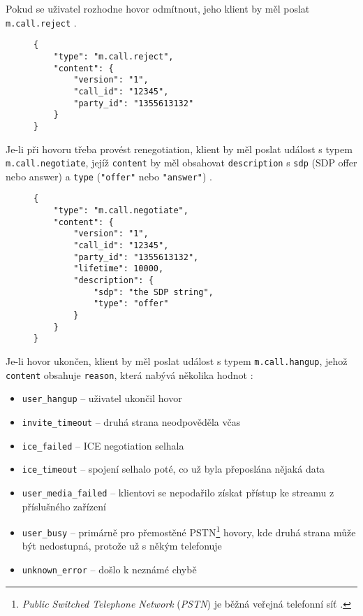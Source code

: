 Pokud se uživatel rozhodne hovor odmítnout, jeho klient by měl poslat
\texttt{m.call.reject} \parencite{GitHub-MSC2746}.

\begin{figure}[H]
    \begin{verbatim}
{
	"type": "m.call.reject",
	"content": {
		"version": "1",
		"call_id": "12345",
		"party_id": "1355613132"
	}
}
	\end{verbatim}
\end{figure}

Je-li při hovoru třeba provést renegotiation, klient by měl poslat událost s
typem \texttt{m.call.negotiate}, jejíž \texttt{content} by
měl obsahovat \texttt{description} s \texttt{sdp} (SDP offer
nebo answer) a \texttt{type} (\texttt{"offer"} nebo
\texttt{"answer"}) \parencite{GitHub-MSC2746}.

\begin{figure}[H]
    \begin{verbatim}
{
	"type": "m.call.negotiate",
	"content": {
		"version": "1",
		"call_id": "12345",
		"party_id": "1355613132",
		"lifetime": 10000,
		"description": {
			"sdp": "the SDP string",
			"type": "offer"
		}
	}
}
	\end{verbatim}
\end{figure}

Je-li hovor ukončen, klient by měl poslat událost s typem
\texttt{m.call.hangup}, jehož \texttt{content} obsahuje
\texttt{reason}, která nabývá několika hodnot \parencite{GitHub-MSC2746}:
\begin{itemize}
    \itemsep0em
    \item \texttt{user_hangup} -- uživatel ukončil hovor
    \item \texttt{invite_timeout} -- druhá strana neodpověděla včas
    \item \texttt{ice_failed} -- ICE negotiation selhala
    \item \texttt{ice_timeout} -- spojení selhalo poté, co už byla
          přeposlána nějaká data
    \item \texttt{user_media_failed} -- klientovi se nepodařilo získat
          přístup ke streamu z příslušného zařízení
    \item \texttt{user_busy} -- primárně pro přemostěné PSTN\footnote{
              \textit{Public Switched Telephone Network} (\textit{PSTN}) je
              běžná veřejná telefonní síť \parencite{Nextiva-PSTN}.
          } hovory,
          kde druhá strana může být nedostupná, protože už s někým telefonuje
    \item \texttt{unknown_error} -- došlo k neznámé chybě
\end{itemize}

